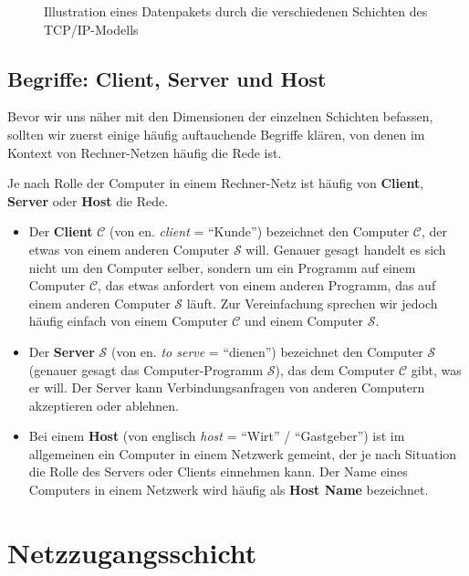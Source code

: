 \begin{figure}[H]
	\centering
	
	\caption{Illustration eines Datenpakets durch die verschiedenen Schichten des \gls{TCP}/\gls{IP}-Modells}
\end{figure}


\subsection{Begriffe: Client, Server und Host}
Bevor wir uns näher mit den Dimensionen der einzelnen Schichten befassen, sollten wir zuerst einige häufig auftauchende Begriffe klären, von denen im Kontext von Rechner-Netzen häufig die Rede ist.

\begin{mydefinition}\label{def:client-server-host}
Je nach Rolle der Computer in einem Rechner-Netz ist häufig von \textbf{Client}, \textbf{Server} oder \textbf{Host} die Rede.
\begin{itemize}
	\item Der \textbf{Client} $\mathcal{C}$ (von en. \textit{client} = \enquote{Kunde}) bezeichnet den Computer $\mathcal{C}$, der etwas von einem anderen Computer $\mathcal{S}$ will. Genauer gesagt handelt es sich nicht um den Computer selber, sondern um ein Programm auf einem Computer $\mathcal{C}$, das etwas anfordert von einem anderen Programm, das auf einem anderen Computer $\mathcal{S}$ läuft. Zur Vereinfachung sprechen wir jedoch häufig einfach von einem Computer $\mathcal{C}$ und einem Computer $\mathcal{S}$.
	\item Der \textbf{Server} $\mathcal{S}$ (von en. \textit{to serve} = \enquote{dienen}) bezeichnet  den Computer $\mathcal{S}$ (genauer gesagt das Computer-Programm $\mathcal{S}$), das dem Computer $\mathcal{C}$ gibt, was er will. Der Server kann Verbindungsanfragen von anderen Computern akzeptieren oder ablehnen.
	\item Bei einem \textbf{Host} (von englisch \textit{host} = \enquote{Wirt} / \enquote{Gastgeber}) ist im allgemeinen ein Computer in einem Netzwerk gemeint, der je nach Situation die Rolle des Servers oder Clients einnehmen kann. Der Name eines Computers in einem Netzwerk wird häufig als \textbf{Host Name} bezeichnet.
\end{itemize}
\end{mydefinition}


\section{\texorpdfstring{\textcolor{\dataLinkLayerColor}{Netzzugangsschicht}}{Netzzugangsschicht}}

